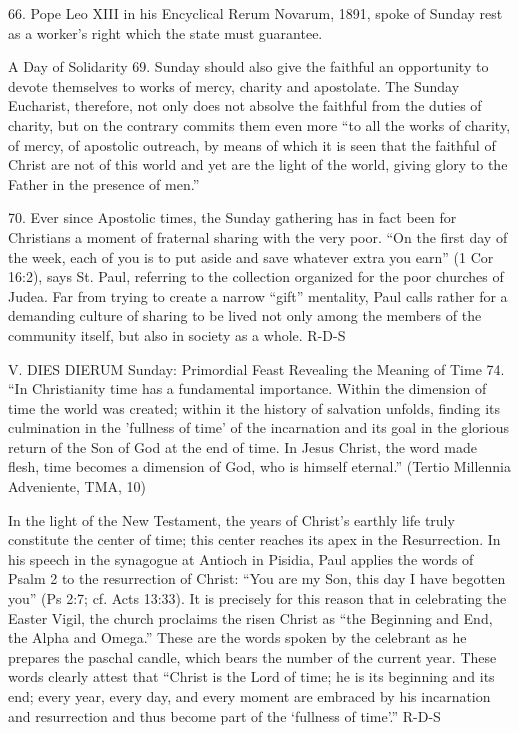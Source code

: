 \documentclass[oneside]{book}
\begin{document}
66. Pope Leo XIII in his Encyclical Rerum Novarum, 1891, spoke of Sunday rest as
a worker's right which the state must guarantee.

A Day of Solidarity
69. Sunday should also give the faithful an opportunity to devote themselves to
works of mercy, charity and apostolate. The Sunday Eucharist, therefore, not
only does not absolve the faithful from the duties of charity, but on the
contrary commits them even more ``to all the works of charity, of mercy, of
apostolic outreach, by means of which it is seen that the faithful of Christ are
not of this world and yet are the light of the world, giving glory to the Father
in the presence of men.''

70. Ever since Apostolic times, the Sunday gathering has in fact been for
Christians a moment of fraternal sharing with the very poor. ``On the first day
of the week, each of you is to put aside and save whatever extra you earn'' (1
Cor 16:2), says St. Paul, referring to the collection organized for the poor
churches of Judea. Far from trying to create a narrow ``gift'' mentality, Paul
calls rather for a demanding culture of sharing to be lived not only among the
members of the community itself, but also in society as a whole.
R-D-S

V. DIES DIERUM
Sunday: Primordial Feast Revealing the Meaning of Time
74. ``In Christianity time has a fundamental importance. Within the dimension of
time the world was created; within it the history of salvation unfolds, finding
its culmination in the 'fullness of time' of the incarnation and its goal in the
glorious return of the Son of God at the end of time. In Jesus Christ, the word
made flesh, time becomes a dimension of God, who is himself eternal.'' (Tertio
Millennia Adveniente, TMA, 10)

In the light of the New Testament, the years of Christ's earthly life truly
constitute the center of time; this center reaches its apex in the
Resurrection. In his speech in the synagogue at Antioch in Pisidia, Paul applies
the words of Psalm 2 to the resurrection of Christ: ``You are my Son, this day I
have begotten you'' (Ps 2:7; cf. Acts 13:33). It is precisely for this reason
that in celebrating the Easter Vigil, the church proclaims the risen Christ as
``the Beginning and End, the Alpha and Omega.'' These are the words spoken by
the celebrant as he prepares the paschal candle, which bears the number of the
current year. These words clearly attest that ``Christ is the Lord of time; he
is its beginning and its end; every year, every day, and every moment are
embraced by his incarnation and resurrection and thus become part of the
`fullness of time'.''
R-D-S
\end{document}
